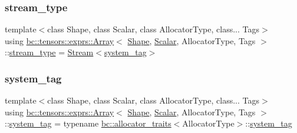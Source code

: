 \subsubsection{\texorpdfstring{stream\+\_\+type}{stream\_type}}
{\footnotesize\ttfamily template$<$class Shape, class Scalar, class Allocator\+Type, class... Tags$>$ \\
using \hyperlink{structbc_1_1tensors_1_1exprs_1_1Array}{bc\+::tensors\+::exprs\+::\+Array}$<$ \hyperlink{structbc_1_1Shape}{Shape}, \hyperlink{namespacebc_aa12ac55ee2c43dc082894dd3859daee1}{Scalar}, Allocator\+Type, Tags $>$\+::\hyperlink{structbc_1_1tensors_1_1exprs_1_1Array_aba97273ba94fb140763e7db5da630ea0}{stream\+\_\+type} =  \hyperlink{classbc_1_1streams_1_1Stream}{Stream}$<$\hyperlink{structbc_1_1tensors_1_1exprs_1_1Array_a116ffe7734f63cf0ca63b32b7cfb0506}{system\+\_\+tag}$>$}

\mbox{\label{structbc_1_1tensors_1_1exprs_1_1Array_a116ffe7734f63cf0ca63b32b7cfb0506}} 
\subsubsection{\texorpdfstring{system\+\_\+tag}{system\_tag}}
{\footnotesize\ttfamily template$<$class Shape, class Scalar, class Allocator\+Type, class... Tags$>$ \\
using \hyperlink{structbc_1_1tensors_1_1exprs_1_1Array}{bc\+::tensors\+::exprs\+::\+Array}$<$ \hyperlink{structbc_1_1Shape}{Shape}, \hyperlink{namespacebc_aa12ac55ee2c43dc082894dd3859daee1}{Scalar}, Allocator\+Type, Tags $>$\+::\hyperlink{structbc_1_1tensors_1_1exprs_1_1Array_a116ffe7734f63cf0ca63b32b7cfb0506}{system\+\_\+tag} =  typename \hyperlink{structbc_1_1allocators_1_1allocator__traits}{bc\+::allocator\+\_\+traits}$<$Allocator\+Type$>$\+::\hyperlink{structbc_1_1tensors_1_1exprs_1_1Array_a116ffe7734f63cf0ca63b32b7cfb0506}{system\+\_\+tag}}

\mbox{\label{structbc_1_1tensors_1_1exprs_1_1Array_a28b34dfcad3f0d35770d64a38f7187a0}} 
